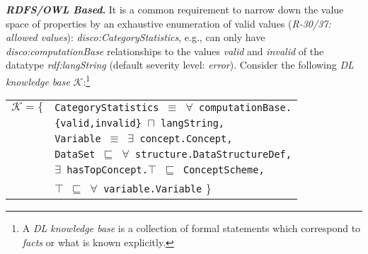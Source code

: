 \documentclass[conference]{IEEEtran}
\newcommand{\ms}[1]{\texttt{#1}}
\newenvironment{DL}{
  \small
  \vspace{0cm}
	\begin{center}
  \begin{tabular}{c l}

}{
  \end{tabular}
	\end{center}
}
\begin{document}
\textbf{\emph{RDFS/OWL Based}.}
It is a common requirement to narrow down the value space of properties by an exhaustive enumeration of valid values (\emph{R-30/37: allowed values}):
\emph{disco:CategoryStatistics}, e.g., can only have \emph{disco:computationBase} relationships to the values \emph{valid} and \emph{invalid} of the datatype \emph{rdf:langString} (default severity level: \emph{error}).
Consider the following \emph{DL knowledge base} $\mathcal{K}$:\footnote{A \emph{DL knowledge base} is a collection of formal statements which correspond to \emph{facts} or what is known explicitly. }
\begin{center}
\begin{DL} 
$\mathcal{K}=\{$ 
&{\small\ms{CategoryStatistics $\equiv$ $\forall$ computationBase.}} \\
	&{\small\ms{\{valid,invalid\} $\sqcap$ langString,}} \\
  &{\small\ms{Variable $\equiv$ $\exists$ concept.Concept,}} \\
	&{\small\ms{DataSet $\sqsubseteq$ $\forall$ structure.DataStructureDef,}} \\
  &{\small\ms{$\exists$ hasTopConcept.$\top$ $\sqsubseteq$ ConceptScheme,}} \\
	&{\small\ms{$\top$ $\sqsubseteq$ $\forall$ variable.Variable}}
\}\\ 
\end{DL}
\end{center}
\end{document}
